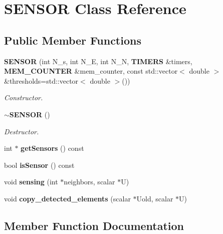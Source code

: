 \section{S\-E\-N\-S\-O\-R Class Reference}
\label{classSENSOR}
\subsection*{Public Member Functions}
\begin{DoxyCompactItemize}
\item 
{\bf S\-E\-N\-S\-O\-R} (int N\-\_\-s, int N\-\_\-\-E, int N\-\_\-\-N, {\bf T\-I\-M\-E\-R\-S} \&timers, {\bf M\-E\-M\-\_\-\-C\-O\-U\-N\-T\-E\-R} \&mem\-\_\-counter, const std\-::vector$<$ double $>$ \&thresholds=std\-::vector$<$ double $>$())\label{classSENSOR_a9cced597424a3b9b76cdc12fc65bed3b}

\begin{DoxyCompactList}\small\item\em Constructor. \end{DoxyCompactList}\item 
{\bf $\sim$\-S\-E\-N\-S\-O\-R} ()\label{classSENSOR_ae0b466e0ba759f6dc724d7a6994f5c4e}

\begin{DoxyCompactList}\small\item\em Destructor. \end{DoxyCompactList}\item 
int $\ast$ {\bf get\-Sensors} () const 
\item 
bool {\bf is\-Sensor} () const 
\item 
void {\bf sensing} (int $\ast$neighbors, scalar $\ast$U)
\item 
void {\bf copy\-\_\-detected\-\_\-elements} (scalar $\ast$Uold, scalar $\ast$U)
\end{DoxyCompactItemize}


\subsection{Member Function Documentation}
